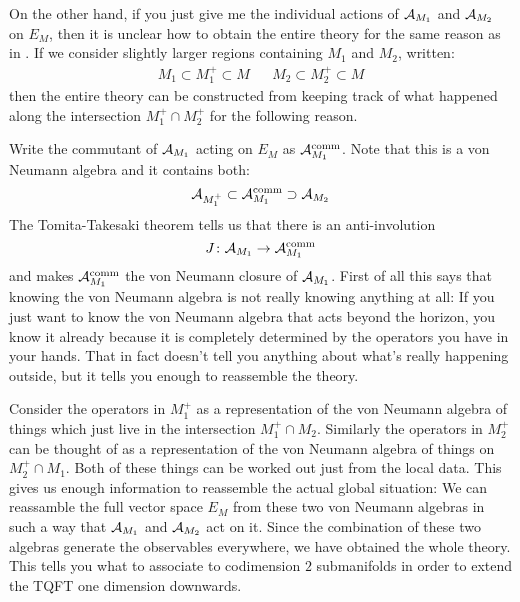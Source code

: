 On the other hand, if you just give me the individual actions of $\mathcal{A}_{M_1}$ and
$\mathcal{A}_{M_2}$ on $E_M$, then it is unclear how to obtain the entire theory for the same
reason as in .
If we consider slightly larger regions containing $M_1$ and $M_2$, written:
\begin{align*}
M_1  \subset M_1^+ \subset M 
&&
M_2 \subset M_2^+ \subset M
\end{align*}
then the entire theory can be constructed from keeping track of what happened along the 
intersection $M_1^+ \cap M_2^+$ for the following reason. 

Write the commutant of $\mathcal{A}_{M_1}$ acting on $E_M$ as 
$\mathcal{A}_{M_1}^{\mathrm{comm}}$. Note that this is a von Neumann algebra and it contains both:
\begin{equation*}
\mathcal{A}_{M_1^+}\subset
\mathcal{A}_{M_1}^{\mathrm{comm}}
\supset \mathcal{A}_{M_2}
\end{equation*}
The Tomita-Takesaki theorem tells us that there is an anti-involution 
\begin{equation*}
J \colon \mathcal{A}_{M_1} \to \mathcal{A}_{M_1}^{\mathrm{comm}}
\end{equation*}
and makes $\mathcal{A}_{M_1}^{\mathrm{comm}}$ the von Neumann closure of $\mathcal{A}_{M_1}$. 
First of all this says that knowing the von Neumann algebra is not really knowing 
anything at all: If you just want to know the von Neumann algebra
that acts beyond the horizon, you know it already because it is completely determined by
the operators you have in your hands. 
That in fact doesn't tell you anything about what's really happening outside, but it tells
you enough to reassemble the theory. 

Consider the operators in $M_1^+$ as a representation of the von Neumann algebra of things
which just live in the intersection $M_1^+\cap M_2$. 
Similarly the operators in $M_2^+$ can be thought of as a representation of the von Neumann
algebra of things on $M_2^+ \cap M_1$. Both of these things can be worked out just from
the local data. This gives us enough information to reassemble the actual global
situation:
We can reassamble the full vector space $E_M$ from these two von Neumann algebras in such
a way that $\mathcal{A}_{M_1}$ and $\mathcal{A}_{M_2}$ act on it. Since the combination of these two
algebras generate the observables everywhere, we have obtained the whole theory. 
This tells you what to associate to codimension $2$ submanifolds in order to extend the
TQFT one dimension downwards. 

